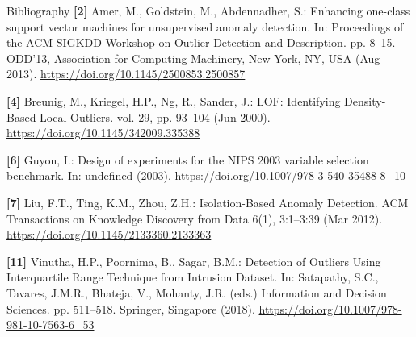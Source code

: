 \documentclass[aspectratio=169,dvipsnames]{beamer}
\begin{document}
\begin{frame}{Bibliography}
	\scriptsize
	\textbf{[2]} Amer, M., Goldstein, M., Abdennadher, S.: Enhancing one-class support vector machines for unsupervised anomaly detection. In: Proceedings of the ACM SIGKDD Workshop on Outlier Detection and Description. pp. 8–15. ODD’13, Association for Computing Machinery, New York, NY, USA (Aug 2013). \url{https://doi.org/10.1145/2500853.2500857}
	\vspace{0.25cm}

	\textbf{[4]} Breunig, M., Kriegel, H.P., Ng, R., Sander, J.: LOF: Identifying Density-Based Local Outliers. vol. 29, pp. 93–104 (Jun 2000). \url{https://doi.org/10.1145/342009.335388}
	\vspace{0.25cm}

	\textbf{[6]} Guyon, I.: Design of experiments for the NIPS 2003 variable selection benchmark. In: undefined (2003). \url{https://doi.org/10.1007/978-3-540-35488-8_10}
	\vspace{0.25cm}

	\textbf{[7]} Liu, F.T., Ting, K.M., Zhou, Z.H.: Isolation-Based Anomaly Detection. ACM Transactions on Knowledge Discovery from Data 6(1), 3:1–3:39 (Mar 2012). \url{https://doi.org/10.1145/2133360.2133363}
	\vspace{0.25cm}

	\textbf{[11]} Vinutha, H.P., Poornima, B., Sagar, B.M.: Detection of Outliers Using Interquartile Range Technique from Intrusion Dataset. In: Satapathy, S.C., Tavares, J.M.R., Bhateja, V., Mohanty, J.R. (eds.) Information and Decision Sciences. pp. 511–518. Springer, Singapore (2018). \url{https://doi.org/10.1007/978-981-10-7563-6_53}
\end{frame}
\end{document}
